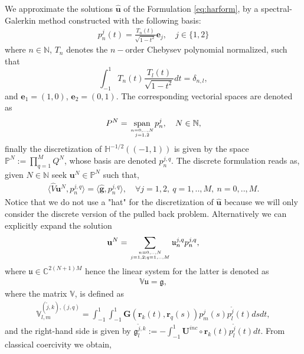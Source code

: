 \documentclass{article}
\DeclareMathOperator{\spn}{span}
\begin{document}
We approximate the solutions $\widehat{\mathbf{u}}$ of the Formulation  \eqref{eq:harform}, by a spectral-Galerkin method constructed with the following basis: 
\begin{align*}
p_n^j(t) = \frac{T_n(t)}{\sqrt{1-t^2}}\mathbf{e}_j, \quad j \in \{1,2\}
\end{align*}
where $n \in \mathbb{N}$, $T_n$ denotes the $n-$order Chebysev polynomial normalized, such that $$ \int_{-1}^1 T_n(t) \frac{T_l(t)}{\sqrt{1-t^2}}dt = \delta_{n,l},$$
 and $\mathbf{e}_1 = (1,0)$, $\mathbf{e}_2 = (0,1)$. The corresponding vectorial spaces are denoted as 
\begin{align*}
P^N  =  \underset{n = 0,..,N \atop j = 1,2}{\spn} {p}^j_n, \quad N \in \mathbb{N},
\end{align*}
finally the discretization of $\mathbf{\mathbb{H}}^{-1/2}((-1,1))$ is given by the space $\mathbb{P}^N  := \prod_{q=1}^M Q^N$, whose basis are denoted $p^{j,q}_n$. The discrete formulation reads as, given $N \in \mathbb{N}$ seek $\mathbf{u}^N \in \mathbb{P}^N$ such that, 
\begin{align}
\label{eq:discrtetbie}
\langle \widehat{V} \mathbf{u}^N, p^{j,q}_n\rangle = \langle \widehat{\mathbf{g}} , p^{j,q}_n\rangle, \quad \forall j = 1,2, \ q = 1,..,M, \ n = 0,..,M.  
\end{align}
Notice that we do not use a "hat" for the discretization of $\widehat{\mathbf{u}}$ because we will only consider the discrete version of the pulled back problem. Alternatively we can explicitly expand the solution \begin{align}
\label{eq:densityrec}
\mathbf{u}^N = \sum_{n = 0,..,N \atop j = 1,2 ; q = 1,..,M} \mathbf{\mathfrak{u}}_n^{j,q}p^{j,q}_n,
\end{align}
where $\mathfrak{u} \in \mathbb{C}^{2(N+1)M}$ hence the linear system for the latter is denoted as 
\begin{align}
\label{eq:linearsystem}
\mathbb{V} \mathbf{\mathfrak{u}} = \mathbf{\mathfrak{g}},
\end{align} 
where the matrix  $\mathbb{V}$, is defined as 
\begin{align*}
\mathbb{V}^{(\tilde{j},k),(j,q)}_{l,m} = \int_{-1}^1 \int_{-1}^1 
\mathbf{G}(\mathbf{r}_k(t),
\mathbf{r}_q(s)) p^j_m(s) p^{\tilde{j}}_l(t)
ds dt,
\end{align*}
and the right-hand side is given by 
${\mathfrak{g}}^{\tilde{j},k}_l := -\int_{-1}^1 \mathbf{U}^{inc} \circ \mathbf{r}_k(t)  p^{\tilde{j}}_l(t) dt$. From classical coercivity we obtain, 
\end{document}

